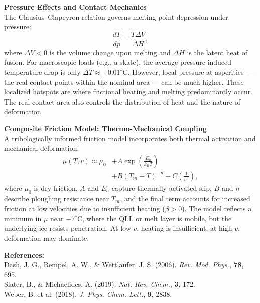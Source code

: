 \begin{technical}
\textbf{Pressure Effects and Contact Mechanics}\\[0.5em]
The Clausius–Clapeyron relation governs melting point depression under pressure:
\[
\frac{dT}{dp} = \frac{T \Delta V}{\Delta H},
\]
where $\Delta V < 0$ is the volume change upon melting and $\Delta H$ is the latent heat of fusion. For macroscopic loads (e.g., a skate), the average pressure-induced temperature drop is only $\Delta T \approx -0.01^\circ$C. However, local pressure at asperities — the real contact points within the nominal area — can be much higher. These localized hotspots are where frictional heating and melting predominantly occur. The real contact area also controls the distribution of heat and the nature of deformation.

\textbf{Composite Friction Model: Thermo-Mechanical Coupling}\\[0.5em]
A tribologically informed friction model incorporates both thermal activation and mechanical deformation:
\begin{align}
    \mu(T, v) \approx \mu_0 &+ A \exp\left(\frac{E_a}{k_B T}\right) \\&+ B (T_m - T)^{-n} + C \left( \frac{1}{v^\beta} \right),
\end{align}
where $\mu_0$ is dry friction, $A$ and $E_a$ capture thermally activated slip, $B$ and $n$ describe ploughing resistance near $T_m$, and the final term accounts for increased friction at low velocities due to insufficient heating ($\beta > 0$). The model reflects a minimum in $\mu$ near $-7^\circ$C, where the QLL or melt layer is mobile, but the underlying ice resists penetration. At low $v$, heating is insufficient; at high $v$, deformation may dominate.

\vspace{0.5em}
\textbf{References:}\\
Dash, J. G., Rempel, A. W., \& Wettlaufer, J. S. (2006). \textit{Rev. Mod. Phys.}, \textbf{78}, 695.\\
Slater, B., \& Michaelides, A. (2019). \textit{Nat. Rev. Chem.}, \textbf{3}, 172.\\
Weber, B. et al. (2018). \textit{J. Phys. Chem. Lett.}, \textbf{9}, 2838.

\end{technical}
